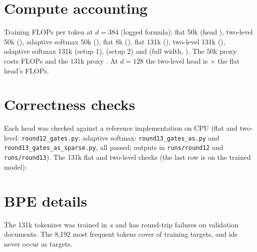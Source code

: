 \documentclass[11pt]{article}
\theoremstyle{remark}
\begin{document}



\appendix
\section{Compute accounting}
Training FLOPs per token at $d=384$ (logged formula): flat 50k \FptB{} (head \ShareB{}), two-level 50k \FptHs{} (\ShareHs{}),
adaptive softmax 50k \FptAs{} (\ShareAs{}), flat 8k \FptFeight{} (\ShareFeight{}), flat 131k \FptFbig{} (\ShareFbig{}),
two-level 131k \FptHbig{} (\ShareHbig{}), adaptive softmax 131k \FptAsBigOne{} (setup 1), \FptAsBigTwo{} (setup 2) and
\FptAsBigW{} (full width, \ShareAsBigW{}). The
50k proxy costs \ProxyFiftyFlops{} FLOPs and the 131k proxy \ProxyFlops{}. At $d=128$ the two-level head is
\HeadRatioSmallTest{}$\times$ the flat head's FLOPs.

\begin{table}[h]
\centering\scriptsize\setlength{\tabcolsep}{3pt}
\resizebox{\linewidth}{!}{}
\caption{Equal-FLOP arms at $d=384$ from the earlier runs. ``FLOPs vs target'' is the ratio to \TargetFlops{} (575M-matched
rows) or \GapFlopsHalf{} (300M-matched rows); the charged 131k two-level row includes the proxy. Decode: random bf16
weights, KV cache, batch 1 and 32. The 131k rows score 23,160,080 of the 23,160,213 validation bytes: the byte-aligned evaluator
leaves 133 bytes ($5.7\times10^{-6}$ of the set) unscored. Both 131k arms drop the same bytes, and even at 20 bits per byte this
moves BPB by about $10^{-4}$, far below every margin.}
\label{tab:partb}
\end{table}

\section{Correctness checks}
Each head was checked against a reference implementation on CPU (flat and two-level:
\texttt{round12\_gates.py};
adaptive softmax: \texttt{round13\_gates\_as.py} and \texttt{round13\_gates\_as\_sparse.py}, all passed; outputs in
\texttt{runs/round12} and \texttt{runs/round13}). The 131k flat and two-level checks (the last row is on the trained model):
\begin{center}\scriptsize\end{center}

\section{BPE details}
The 131k tokenizer was trained in \BigTrainS{}\,s and has \BigRoundTrip{} round-trip failures on \BigRoundTripDocs{} validation
documents. The 8,192 most frequent tokens cover \TopShareK{} of training targets, and \UnseenIds{} ids never occur as targets.
\end{document}
